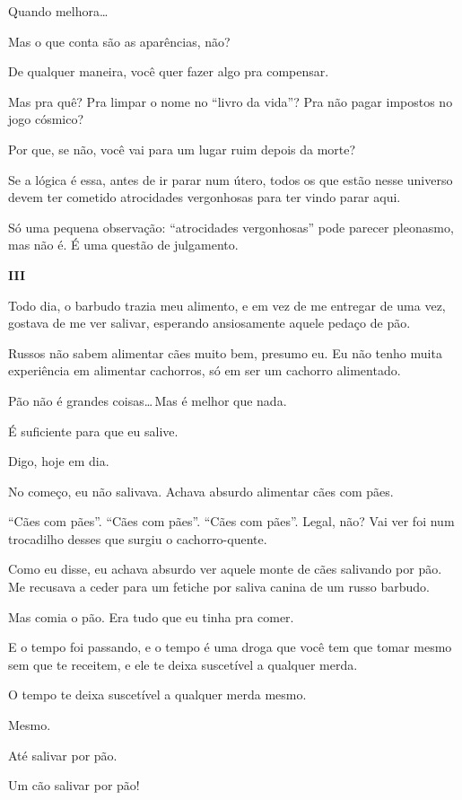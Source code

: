 Quando melhora\ldots

Mas o que conta são as aparências, não?

De qualquer maneira, você quer fazer algo pra compensar.

Mas pra quê? Pra limpar o nome no ``livro da vida''? Pra não pagar impostos no jogo cósmico?

Por que, se não, você vai para um lugar ruim depois da morte?

Se a lógica é essa, antes de ir parar num útero, todos os que estão nesse universo devem ter cometido atrocidades vergonhosas para ter vindo parar aqui.

Só uma pequena observação: ``atrocidades vergonhosas'' pode parecer pleonasmo, mas não é. É uma questão de julgamento.

\begin{center}
{\Large \textbf{III}}
\end{center}

Todo dia, o barbudo trazia meu alimento, e em vez de me entregar de uma vez, gostava de me ver salivar, esperando ansiosamente aquele pedaço de pão.

Russos não sabem alimentar cães muito bem, presumo eu. Eu não tenho muita experiência em alimentar cachorros, só em ser um cachorro alimentado.

Pão não é grandes coisas\ldots\,Mas é melhor que nada.

É suficiente para que eu salive.

Digo, hoje em dia.

No começo, eu não salivava. Achava absurdo alimentar cães com pães.

``Cães com pães''. ``Cães com pães''. ``Cães com pães''. Legal, não? Vai ver foi num trocadilho desses que surgiu o ca\-chor\-ro-quen\-te.

Como eu disse, eu achava absurdo ver aquele monte de cães salivando por pão. Me recusava a ceder para um fetiche por saliva canina de um russo barbudo.

Mas comia o pão. Era tudo que eu tinha pra comer.

E o tempo foi passando, e o tempo é uma droga que você tem que tomar mesmo sem que te receitem, e ele te deixa suscetível a qualquer merda.

O tempo te deixa suscetível a qualquer merda mesmo.

Mesmo.

Até salivar por pão.

Um cão salivar por pão!

